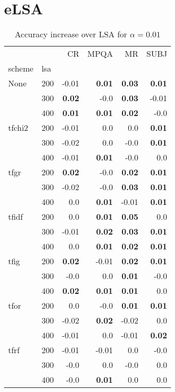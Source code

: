 \section{eLSA}

\begin{table}[h]
\begin{center}

\begin{tabular}{ll|rrrr}
\toprule
   &   &   CR &  MPQA &   MR &  SUBJ \\
scheme & lsa &        &        &        &        \\
\midrule
None & 200 &     -0.01 & \textbf{0.01} & \textbf{0.03} & \textbf{0.01} \\
   & 300 & \textbf{0.02} &     -0.0 & \textbf{0.03} &     -0.01 \\
   & 400 & \textbf{0.01} & \textbf{0.01} & \textbf{0.02} &     -0.0 \\
tfchi2 & 200 &     -0.01 &      0.0 &      0.0 & \textbf{0.01} \\
   & 300 &     -0.02 &      0.0 &     -0.0 & \textbf{0.01} \\
   & 400 &     -0.01 & \textbf{0.01} &     -0.0 &      0.0 \\
tfgr & 200 & \textbf{0.02} &     -0.0 & \textbf{0.02} & \textbf{0.01} \\
   & 300 &     -0.02 &     -0.0 & \textbf{0.03} & \textbf{0.01} \\
   & 400 &      0.0 & \textbf{0.01} &     -0.01 & \textbf{0.01} \\
tfidf & 200 &      0.0 & \textbf{0.01} & \textbf{0.05} &      0.0 \\
   & 300 &     -0.01 & \textbf{0.02} & \textbf{0.03} & \textbf{0.01} \\
   & 400 &      0.0 & \textbf{0.01} & \textbf{0.02} & \textbf{0.01} \\
tfig & 200 & \textbf{0.02} &     -0.01 & \textbf{0.02} & \textbf{0.01} \\
   & 300 &     -0.0 &      0.0 & \textbf{0.01} &     -0.0 \\
   & 400 & \textbf{0.02} & \textbf{0.01} & \textbf{0.01} &      0.0 \\
tfor & 200 &      0.0 &     -0.0 & \textbf{0.01} & \textbf{0.01} \\
   & 300 &     -0.02 & \textbf{0.02} &     -0.02 &      0.0 \\
   & 400 &     -0.01 &      0.0 &     -0.01 & \textbf{0.02} \\
tfrf & 200 &     -0.01 &     -0.01 &      0.0 &     -0.0 \\
   & 300 &     -0.0 &      0.0 &     -0.0 &      0.0 \\
   & 400 &     -0.0 & \textbf{0.01} &      0.0 &      0.0 \\
\bottomrule
\end{tabular}

\caption[Accuracy increase over LSA for $\alpha=0.01$]{Accuracy increase over LSA for $\alpha=0.01$}
\label{tab:batch:results0.01}
\end{center}
\end{table}






